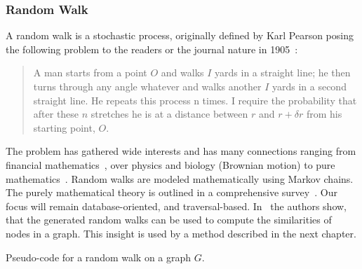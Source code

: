             \subsubsection*{Random Walk}\label{rand-w}
                A random walk is a stochastic process, originally defined by Karl Pearson posing the following problem to the readers or the journal nature in 1905~\autocite{pearson1905problem}: 
                \begin{quote}
                    A man starts from a point $O$ and walks $I$ yards in a straight line; he then turns through any angle whatever and walks another $I$ yards in a second straight line. 
                    He repeats this process n times. 
                    I require the probability that after these $n$ stretches he is at a distance between $r$ and $r + \delta r$ from his starting point, $O$.
                \end{quote}
                The problem has gathered wide interests and has many connections ranging from financial mathematics~\autocite{bachelier1900theorie}, over physics and biology (Brownian motion\autocite{brown1828xxvii}) to pure mathematics~\autocite{wiener1976collected}. 
                Random walks are modeled mathematically using Markov chains.            
                The purely mathematical theory is outlined in a comprehensive survey~\autocite{lovasz1993random}. 
                Our focus will remain database-oriented, and traversal-based.
                In~\autocite{fouss2007random} the authors show, that the generated random walks can be used to compute the similarities of nodes in a graph. 
                This insight is used by a method described in the next chapter.
                
                \begin{algorithm}[htp]
                    \hrulealg
                \caption{Pseudo-code for a random walk on a graph $G$.}\label{random_walk}
                \end{algorithm}
                
